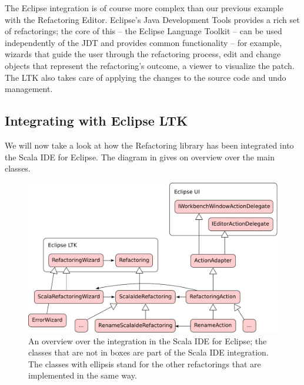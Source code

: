 \documentclass[10pt,a4paper,oneside]{scrreprt}
\begin{document}
The Eclipse integration is of course more complex than our previous example with the Refactoring Editor. Eclipse's Java Development Tools provides a rich set of refactorings; the core of this -- the Eclipse Language Toolkit \cite{LTK} -- can be used independently of the JDT and provides common functionality -- for example, wizards that guide the user through the refactoring process, edit and change objects that represent the refactoring's outcome, a viewer to visualize the patch. The LTK also takes care of applying the changes to the source code and undo management. 

\subsection{Integrating with Eclipse LTK}

We will now take a look at how the Refactoring library has been integrated into the Scala IDE for Eclipse. The diagram in  gives on overview over the main classes. 

\begin{figure}
  \centering
  \includegraphics[width=\linewidth]{eclipse-integration.pdf}
  \caption{An overview over the integration in the Scala IDE for Eclipse; the classes that are not in boxes are part of the Scala IDE integration. The classes with ellipsis stand for the other refactorings that are implemented in the same way.}
  \label{figure:eclipse-integration}
\end{figure}
\end{document}

